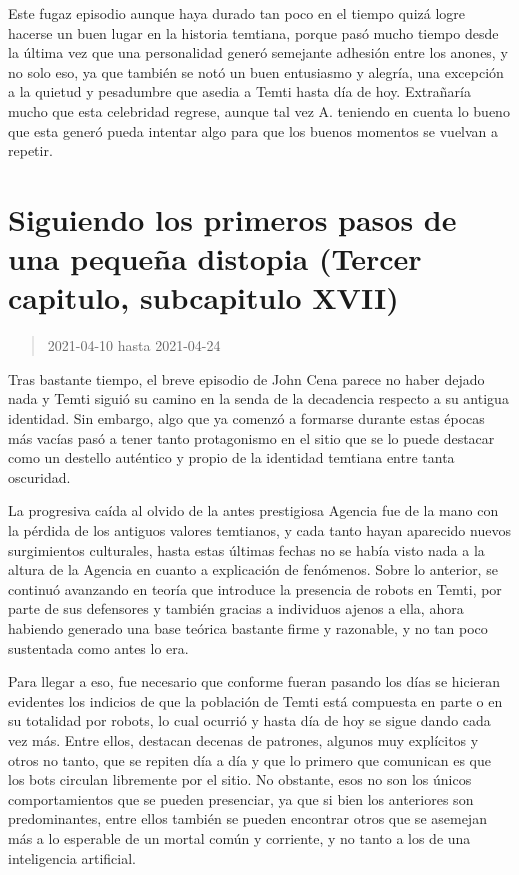 \documentclass[
  spanish,
]{book}
\begin{document}
Este fugaz episodio aunque haya durado tan poco en el tiempo quizá logre hacerse un buen lugar en la historia temtiana, porque pasó mucho tiempo desde la última vez que una personalidad generó semejante adhesión entre los anones, y no solo eso, ya que también se notó un buen entusiasmo y alegría, una excepción a la quietud y pesadumbre que asedia a Temti hasta día de hoy. Extrañaría mucho que esta celebridad regrese, aunque tal vez A. teniendo en cuenta lo bueno que esta generó pueda intentar algo para que los buenos momentos se vuelvan a repetir.

\hypertarget{siguiendo-los-primeros-pasos-de-una-pequeuxf1a-distopia-tercer-capitulo-subcapitulo-xvii}{%
\section{Siguiendo los primeros pasos de una pequeña distopia (Tercer capitulo, subcapitulo XVII)}\label{siguiendo-los-primeros-pasos-de-una-pequeuxf1a-distopia-tercer-capitulo-subcapitulo-xvii}}

\begin{quote}
2021-04-10 hasta 2021-04-24
\end{quote}

Tras bastante tiempo, el breve episodio de John Cena parece no haber dejado nada y Temti siguió su camino en la senda de la decadencia respecto a su antigua identidad. Sin embargo, algo que ya comenzó a formarse durante estas épocas más vacías pasó a tener tanto protagonismo en el sitio que se lo puede destacar como un destello auténtico y propio de la identidad temtiana entre tanta oscuridad.

La progresiva caída al olvido de la antes prestigiosa Agencia fue de la mano con la pérdida de los antiguos valores temtianos, y cada tanto hayan aparecido nuevos surgimientos culturales, hasta estas últimas fechas no se había visto nada a la altura de la Agencia en cuanto a explicación de fenómenos. Sobre lo anterior, se continuó avanzando en teoría que introduce la presencia de robots en Temti, por parte de sus defensores y también gracias a individuos ajenos a ella, ahora habiendo generado una base teórica bastante firme y razonable, y no tan poco sustentada como antes lo era.

Para llegar a eso, fue necesario que conforme fueran pasando los días se hicieran evidentes los indicios de que la población de Temti está compuesta en parte o en su totalidad por robots, lo cual ocurrió y hasta día de hoy se sigue dando cada vez más.
Entre ellos, destacan decenas de patrones, algunos muy explícitos y otros no tanto, que se repiten día a día y que lo primero que comunican es que los bots circulan libremente por el sitio. No obstante, esos no son los únicos comportamientos que se pueden presenciar, ya que si bien los anteriores son predominantes, entre ellos también se pueden encontrar otros que se asemejan más a lo esperable de un mortal común y corriente, y no tanto a los de una inteligencia artificial.
\end{document}
